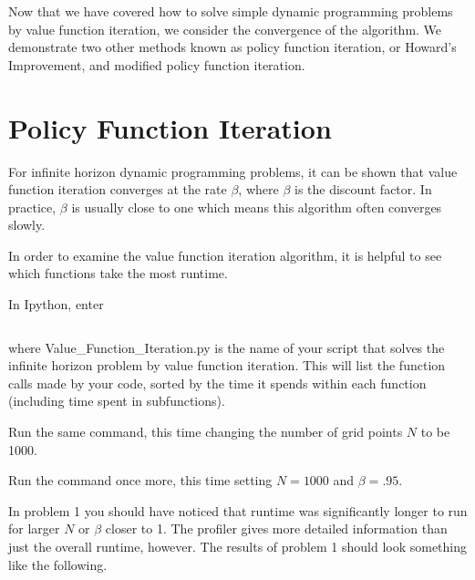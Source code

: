 

Now that we have covered how to solve simple dynamic programming problems by value function iteration, we consider the convergence of the algorithm.  We demonstrate two other methods known as policy function iteration, or Howard's Improvement, and modified policy function iteration.

\section*{Policy Function Iteration}
For infinite horizon dynamic programming problems, it can be shown that value function iteration converges at the rate $\beta$, where $\beta$ is the discount factor.  In practice, $\beta$ is usually close to one which means this algorithm often converges slowly.

In order to examine the value function iteration algorithm, it is helpful to see which functions take the most runtime.

\begin{problem}
In Ipython, enter
\begin{lstlisting}[style=python]
%run -p -s cum Value_Function_Iteration.py
\end{lstlisting}
where Value\_Function\_Iteration.py is the name of your script that solves the infinite horizon problem by value function iteration.  This will list the function calls made by your code, sorted by the time it spends within each function (including time spent in subfunctions).

Run the same command, this time changing the number of grid points $N$ to be 1000.

Run the command once more, this time setting $N=1000$ and $\beta = .95$.
\end{problem}

In problem 1 you should have noticed that runtime was significantly longer to run for larger $N$ or $\beta$ closer to 1.  The profiler gives more detailed information than just the overall runtime, however.  The results of problem 1 should look something like the following.

